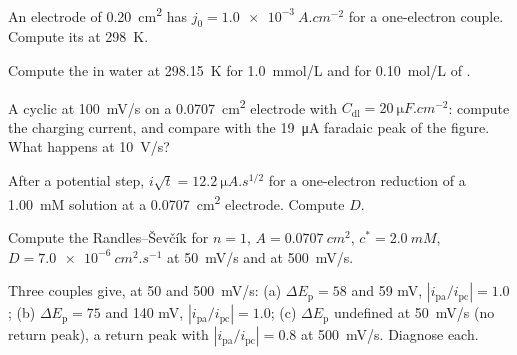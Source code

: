 \begin{exercise}[$\star$]\label{exo:b3:electrode-kinetics:2}
An electrode of \qty{0.20}{cm^2} has $j_0 = \qty{1.0e-3}{A.cm^{-2}}$ for a one-electron couple.
Compute its  at \qty{298}{K}.
\end{exercise}

\begin{exercise}[$\star$]\label{exo:b3:electrode-kinetics:3}
Compute the  in water at \qty{298.15}{K} for \qty{1.0}{mmol/L} and for \qty{0.10}{mol/L}
of .
\end{exercise}

\begin{exercise}[$\star$]\label{exo:b3:electrode-kinetics:4}
A cyclic  at \qty{100}{mV/s} on a \qty{0.0707}{cm^2} electrode with $C_{\mathrm{dl}} =
\qty{20}{\micro F.cm^{-2}}$: compute the charging current, and compare with the
\qty{19}{\micro A} faradaic peak of the figure. What happens at \qty{10}{V/s}?
\end{exercise}

\begin{exercise}[$\star\star$]\label{exo:b3:electrode-kinetics:5}
After a potential step, $i\sqrt t = \qty{12.2}{\micro A.s^{1/2}}$ for a one-electron reduction of a
\qty{1.00}{mM} solution at a \qty{0.0707}{cm^2} electrode. Compute $D$.
\end{exercise}

\begin{exercise}[$\star\star$]\label{exo:b3:electrode-kinetics:6}
Compute the Randles--Ševčík  for $n = 1$, $A = \qty{0.0707}{cm^2}$, $c^* = \qty{2.0}{mM}$,
$D = \qty{7.0e-6}{cm^2.s^{-1}}$ at \qty{50}{mV/s} and at \qty{500}{mV/s}.
\end{exercise}

\begin{exercise}[$\star\star$]\label{exo:b3:electrode-kinetics:7}
Three couples give, at 50 and \qty{500}{mV/s}: (a) $\Delta E_{\mathrm p} = 58$ and 59 mV, $|i_{\mathrm{pa}}/i_{\mathrm{pc}}| = 1.0$;
(b) $\Delta E_{\mathrm p} = 75$ and 140 mV, $|i_{\mathrm{pa}}/i_{\mathrm{pc}}| = 1.0$; (c) $\Delta E_{\mathrm p}$ undefined at \qty{50}{mV/s} (no
return peak), a return peak with $|i_{\mathrm{pa}}/i_{\mathrm{pc}}| = 0.8$ at \qty{500}{mV/s}. Diagnose each.
\end{exercise}

